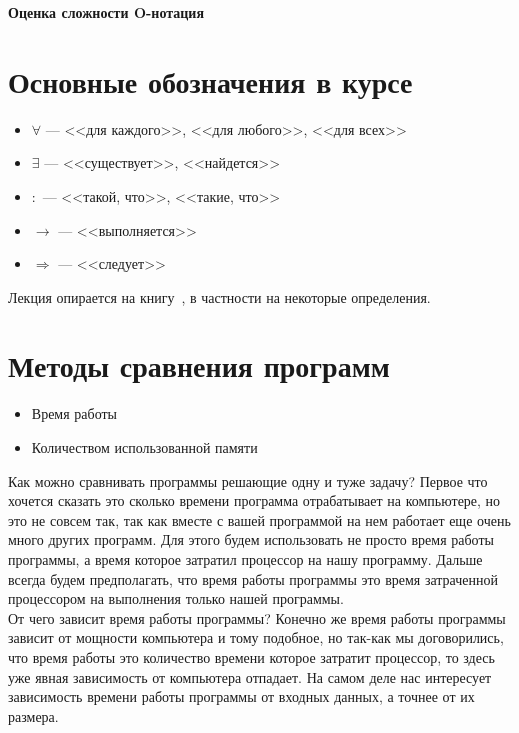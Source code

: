 \documentclass[12pt, twoside]{article}
\begin{document}
 

\begin{center}
{\LARGE\bf
Оценка сложности O-нотация
}
\end{center}

\section{Основные обозначения в курсе}
\begin{itemize}
	\item $\forall$ --- <<для каждого>>, <<для любого>>, <<для всех>>
	\item $\exists$ --- <<существует>>, <<найдется>>
	\item $:$ --- <<такой, что>>, <<такие, что>>
	\item $\rightarrow$ --- <<выполняется>>
	\item $\Rightarrow$ --- <<следует>>
\end{itemize}

Лекция опирается на книгу~\cite{Korman}, в частности на некоторые определения.

\section{Методы сравнения программ}

\begin{itemize}
	\item Время работы
	\item Количеством использованной памяти
\end{itemize}

Как можно сравнивать программы решающие одну и туже задачу? Первое что хочется сказать это сколько времени программа отрабатывает на компьютере, но это не совсем так, так как вместе с вашей программой на нем работает еще очень много других программ. Для этого будем использовать не просто время работы программы, а время которое затратил процессор на нашу программу. Дальше всегда будем предполагать, что время работы программы это время затраченной процессором на выполнения только нашей программы.\\

От чего зависит время работы программы? Конечно же время работы программы зависит от мощности компьютера и тому подобное, но так-как мы договорились, что время работы это количество времени которое затратит процессор, то здесь уже явная зависимость от компьютера отпадает. На самом деле нас интересует зависимость времени работы программы от входных данных, а точнее от их размера.\\
\end{document}
